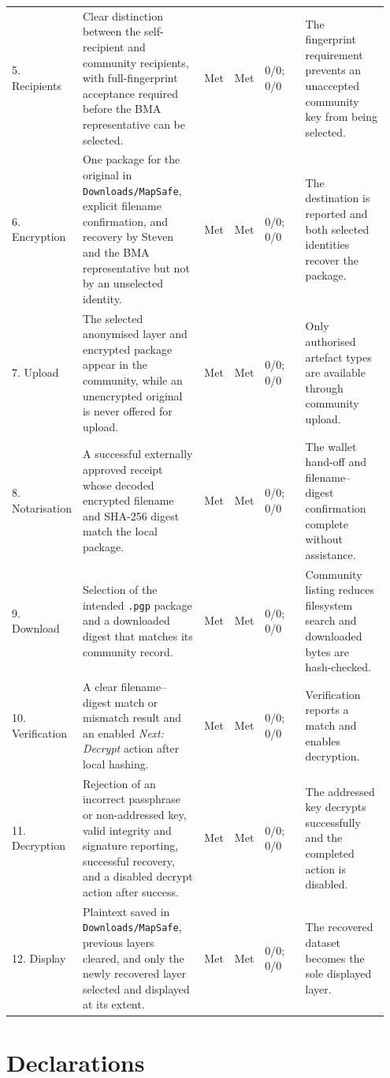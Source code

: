 \documentclass[]{interact}
\begin{document}
{\begin{longtable}{@{}p{0.095\linewidth}p{0.355\linewidth}p{0.06\linewidth}p{0.06\linewidth}p{0.13\linewidth}p{0.25\linewidth}@{}}
5. Recipients & Clear distinction between the self-recipient and community recipients, with full-fingerprint acceptance required before the BMA representative can be selected. & Met & Met & 0/0; 0/0 & The fingerprint requirement prevents an unaccepted community key from being selected. \\
6. Encryption & One package for the original in \texttt{Downloads/MapSafe}, explicit filename confirmation, and recovery by Steven and the BMA representative but not by an unselected identity. & Met & Met & 0/0; 0/0 & The destination is reported and both selected identities recover the package. \\
7. Upload & The selected anonymised layer and encrypted package appear in the community, while an unencrypted original is never offered for upload. & Met & Met & 0/0; 0/0 & Only authorised artefact types are available through community upload. \\
8. Notarisation & A successful externally approved receipt whose decoded encrypted filename and SHA-256 digest match the local package. & Met & Met & 0/0; 0/0 & The wallet hand-off and filename--digest confirmation complete without assistance. \\
9. Download & Selection of the intended \texttt{.pgp} package and a downloaded digest that matches its community record. & Met & Met & 0/0; 0/0 & Community listing reduces filesystem search and downloaded bytes are hash-checked. \\
10. Verification & A clear filename--digest match or mismatch result and an enabled \emph{Next: Decrypt} action after local hashing. & Met & Met & 0/0; 0/0 & Verification reports a match and enables decryption. \\
11. Decryption & Rejection of an incorrect passphrase or non-addressed key, valid integrity and signature reporting, successful recovery, and a disabled decrypt action after success. & Met & Met & 0/0; 0/0 & The addressed key decrypts successfully and the completed action is disabled. \\
12. Display & Plaintext saved in \texttt{Downloads/MapSafe}, previous layers cleared, and only the newly recovered layer selected and displayed at its extent. & Met & Met & 0/0; 0/0 & The recovered dataset becomes the sole displayed layer. \\
\end{longtable}
}


\section*{Declarations}
\end{document}
